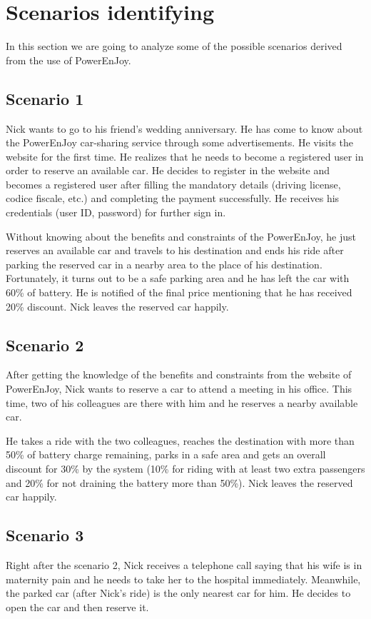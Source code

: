 \chapter{Scenarios identifying}
In this section we are going to analyze some of the possible scenarios derived from the use of PowerEnJoy.

\section{Scenario 1}
Nick wants to go to his friend's wedding anniversary. He has come to know about the PowerEnJoy car-sharing service through some advertisements. He visits the website for the first time. He realizes that he needs to become a registered user in order to reserve an available car. He decides to register in the website and becomes a registered user after filling the mandatory details (driving license, codice fiscale, etc.) and completing the payment successfully. He receives his credentials (user ID, password) for further sign in.

Without knowing about the benefits and constraints of the PowerEnJoy, he just reserves an available car and travels to his destination and ends his ride after parking the reserved car in a nearby area to the place of his destination. Fortunately, it turns out to be a safe parking area and he has left the car with 60\% of battery. He is notified of the final price mentioning that he has received 20\% discount. Nick leaves the reserved car happily.

\section{Scenario 2}
After getting the knowledge of the benefits and constraints from the website of PowerEnJoy, Nick wants to reserve a car to attend a meeting in his office. This time, two of his colleagues are there with him and he reserves a nearby available car.

He takes a ride with the two colleagues, reaches the destination with more than 50\% of battery charge remaining, parks in a safe area and gets an overall discount for 30\% by the system (10\% for riding with at least two extra passengers and 20\% for not draining the battery more than 50\%). Nick leaves the reserved car happily.

\section{Scenario 3}
Right after the scenario 2, Nick receives a telephone call saying that his wife is in maternity pain and he needs to take her to the hospital immediately. Meanwhile, the parked car (after Nick's ride) is the only nearest car for him. He decides to open the car and then reserve it.

